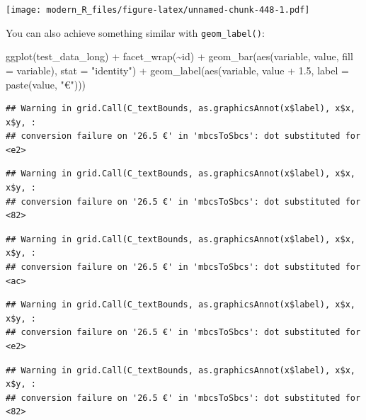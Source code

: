 \documentclass[
]{article}
\newenvironment{Shaded}{\begin{snugshade}}{\end{snugshade}}
\newcommand{\AttributeTok}[1]{\textcolor[rgb]{0.77,0.63,0.00}{#1}}
\newcommand{\FloatTok}[1]{\textcolor[rgb]{0.00,0.00,0.81}{#1}}
\newcommand{\FunctionTok}[1]{\textcolor[rgb]{0.00,0.00,0.00}{#1}}
\newcommand{\NormalTok}[1]{#1}
\newcommand{\SpecialCharTok}[1]{\textcolor[rgb]{0.00,0.00,0.00}{#1}}
\newcommand{\StringTok}[1]{\textcolor[rgb]{0.31,0.60,0.02}{#1}}
\begin{document}
\texttt{[image: modern\_R\_files/figure-latex/unnamed-chunk-448-1.pdf]}

You can also achieve something similar with \texttt{geom\_label()}:

\begin{Shaded}
\begin{Highlighting}[]
\FunctionTok{ggplot}\NormalTok{(test\_data\_long) }\SpecialCharTok{+}
  \FunctionTok{facet\_wrap}\NormalTok{(}\SpecialCharTok{\textasciitilde{}}\NormalTok{id) }\SpecialCharTok{+}
  \FunctionTok{geom\_bar}\NormalTok{(}\FunctionTok{aes}\NormalTok{(variable, value, }\AttributeTok{fill =}\NormalTok{ variable), }\AttributeTok{stat =} \StringTok{"identity"}\NormalTok{) }\SpecialCharTok{+}
  \FunctionTok{geom\_label}\NormalTok{(}\FunctionTok{aes}\NormalTok{(variable, value }\SpecialCharTok{+} \FloatTok{1.5}\NormalTok{, }\AttributeTok{label =} \FunctionTok{paste}\NormalTok{(value, }\StringTok{"€"}\NormalTok{)))}
\end{Highlighting}
\end{Shaded}

\begin{verbatim}
## Warning in grid.Call(C_textBounds, as.graphicsAnnot(x$label), x$x, x$y, :
## conversion failure on '26.5 €' in 'mbcsToSbcs': dot substituted for <e2>
\end{verbatim}

\begin{verbatim}
## Warning in grid.Call(C_textBounds, as.graphicsAnnot(x$label), x$x, x$y, :
## conversion failure on '26.5 €' in 'mbcsToSbcs': dot substituted for <82>
\end{verbatim}

\begin{verbatim}
## Warning in grid.Call(C_textBounds, as.graphicsAnnot(x$label), x$x, x$y, :
## conversion failure on '26.5 €' in 'mbcsToSbcs': dot substituted for <ac>
\end{verbatim}

\begin{verbatim}
## Warning in grid.Call(C_textBounds, as.graphicsAnnot(x$label), x$x, x$y, :
## conversion failure on '26.5 €' in 'mbcsToSbcs': dot substituted for <e2>
\end{verbatim}

\begin{verbatim}
## Warning in grid.Call(C_textBounds, as.graphicsAnnot(x$label), x$x, x$y, :
## conversion failure on '26.5 €' in 'mbcsToSbcs': dot substituted for <82>
\end{verbatim}
\end{document}
